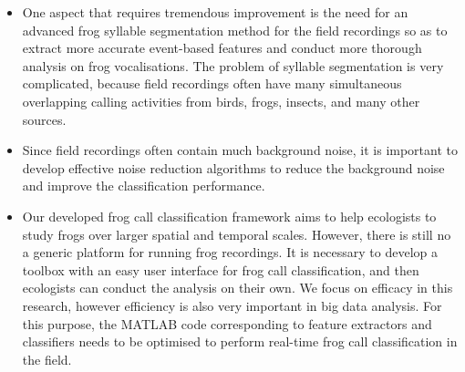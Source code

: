 \begin{itemize}

\item  One aspect that requires tremendous improvement is the need for an advanced frog syllable segmentation method for the field recordings so as to extract more accurate event-based features and conduct more thorough analysis on frog vocalisations. The problem of syllable segmentation is very complicated, because field recordings often have many simultaneous overlapping calling activities from birds, frogs, insects, and many other sources. 

\item Since field recordings often contain much background noise, it is important to develop effective noise reduction algorithms to reduce the background noise and improve the classification performance.



\item Our developed frog call classification framework aims to help ecologists to study frogs over larger spatial and temporal scales. However, there is still no a generic platform for running frog recordings. It is necessary to develop a toolbox with an easy user interface for frog call classification, and then ecologists can conduct the analysis on their own. We focus on efficacy in this research, however efficiency is also very important in big data analysis. For this purpose, the MATLAB code corresponding to feature extractors and classifiers needs to be optimised to perform real-time frog call classification in the field.


\end{itemize}










